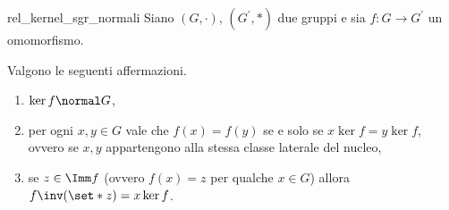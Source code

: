 \begin{proposition}
    {rel_kernel_sgr_normali}
    Siano $(G, \cdot)$, $(G^\prime, *)$ due gruppi e sia $f : G \to G^\prime$ un omomorfismo. 
    
    Valgono le seguenti affermazioni.
    \begin{enumerate}[label={(\roman*)}]
        \item $\ker f \normal G$,
        \item per ogni $x, y \in G$ vale che $f(x) = f(y)$ se e solo se $x\ker f = y\ker f$, ovvero se $x, y$ appartengono alla stessa classe laterale del nucleo,
        \item se $z \in \Imm f$ (ovvero $f(x) = z$ per qualche $x \in G$) allora $f\inv(\set*{z}) = x\ker f$.
    \end{enumerate}
\end{proposition}
